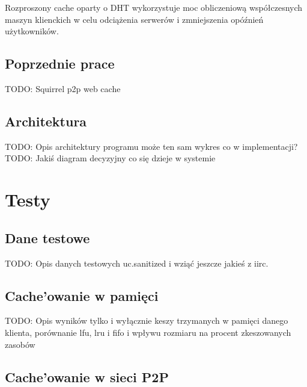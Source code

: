 \documentclass[a4paper,11pt]{scrartcl}
\newcommand{\s}{ }
\newcommand{\kesz}{cache}
\newcommand{\Keszowanie}{Cache'owanie}
\begin{document}
Rozproszony \kesz\s oparty o DHT wykorzystuje moc obliczeniową współczesnych maszyn klienckich w celu odciążenia serwerów i zmniejszenia opóźnień użytkowników.

\subsection{Poprzednie prace}
TODO: Squirrel p2p web cache \cite{iyer2002squirrel}

\subsection{Architektura}
TODO: Opis architektury programu może ten sam wykres co w implementacji?
TODO: Jakiś diagram decyzyjny co się dzieje w systemie

\section{Testy}
\label{sect_tests}

\subsection{Dane testowe}
TODO: Opis danych testowych uc.sanitized i wziąć jeszcze jakieś z iirc.

\subsection{\Keszowanie\s w pamięci}
TODO: Opis wyników tylko i wyłącznie keszy trzymanych w pamięci danego klienta, porównanie lfu, lru i fifo i wpływu rozmiaru na procent zkeszowanych zasobów

\subsection{\Keszowanie\s w sieci P2P}
\end{document}
